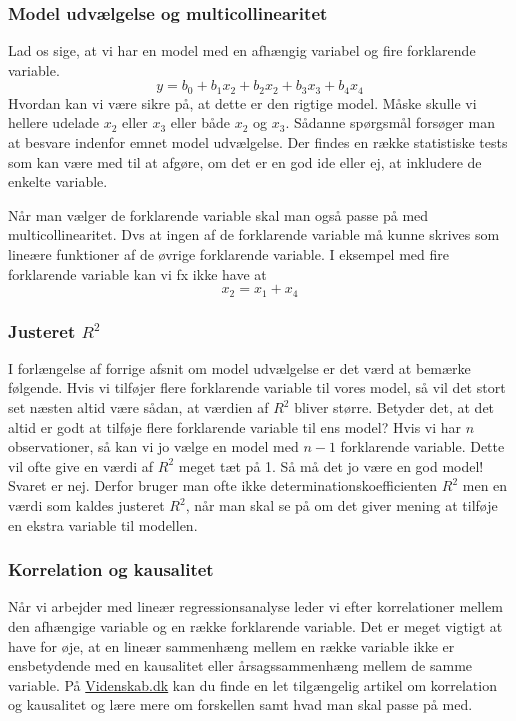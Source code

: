 \subsubsection{Model udvælgelse og multicollinearitet}
Lad os sige, at vi har en model med en afhængig variabel og fire forklarende variable.
\begin{displaymath}
    y = b_0 + b_1 x_2 + b_2 x_2 + b_3 x_3 + b_4 x_4
\end{displaymath}
Hvordan kan vi være sikre på, at dette er den rigtige model. Måske skulle vi hellere udelade \(x_2\) eller \(x_3\) eller både \(x_2\) og \(x_3\). Sådanne spørgsmål forsøger man at besvare indenfor emnet model udvælgelse. Der findes en række statistiske tests som kan være med til at afgøre, om det er en god ide eller ej, at inkludere de enkelte variable.

Når man vælger de forklarende variable skal man også passe på med multicollinearitet. Dvs at ingen af de forklarende variable må kunne skrives som lineære funktioner af de øvrige forklarende variable. I eksempel med fire forklarende variable kan vi fx ikke have at
\begin{displaymath}
    x_2 = x_1 + x_4
\end{displaymath}

\subsubsection{Justeret \(R^2\)}
I forlængelse af forrige afsnit om model udvælgelse er det værd at bemærke følgende. Hvis vi tilføjer flere forklarende variable til vores model, så vil det stort set næsten altid være sådan, at værdien af \(R^2\) bliver større. Betyder det, at det altid er godt at tilføje flere forklarende variable til ens model? Hvis vi har \(n\) observationer, så kan vi jo vælge en model med \(n-1\) forklarende variable. Dette vil ofte give en værdi af \(R^2\) meget tæt på 1. Så må det jo være en god model! Svaret er nej. Derfor bruger man ofte ikke determinationskoefficienten \(R^2\) men en værdi som kaldes justeret \(R^2\), når man skal se på om det giver mening at tilføje en ekstra variable til modellen.

\subsubsection{Korrelation og kausalitet}
Når vi arbejder med lineær regressionsanalyse leder vi efter korrelationer mellem den afhængige variable og en række forklarende variable. Det er meget vigtigt at have for øje, at en lineær sammenhæng mellem en række variable ikke er ensbetydende med en kausalitet eller årsagssammenhæng mellem de samme variable. På \href{http://videnskab.dk/kultur-samfund/korrelation-eller-kausalitet-hvornaar-er-der-en-aarsagssammenhaeng}{Videnskab.dk} kan du finde en let tilgængelig artikel om korrelation og kausalitet og lære mere om forskellen samt hvad man skal passe på med.
